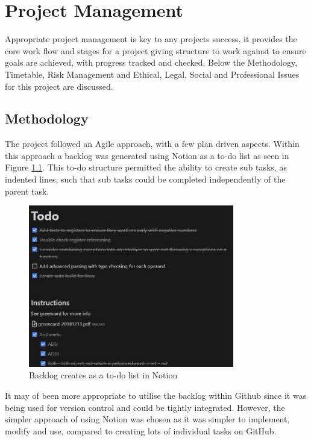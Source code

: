 \chapter{Project Management}
\label{ch:project_management}

Appropriate project management is key to any projects success, it provides the core work flow and stages for a project giving structure to work against to ensure goals are achieved, with progress tracked and checked. Below the Methodology, Timetable, Risk Management and Ethical, Legal, Social and Professional Issues for this project are discussed.

\section{Methodology}
The project followed an Agile \cite{atlassian_2022_what} approach, with a few plan driven aspects. Within this approach a backlog was generated using Notion \cite{notionlabs_2023_your} as a to-do list as seen in Figure \ref{fig:notion}. This to-do structure permitted the ability to create sub tasks, as indented lines, such that sub tasks could be completed independently of the parent task.

\begin{figure}
    \centering
    \includegraphics[width=0.8\textwidth]{dissertation/DATA/notion-todo.jpg}
    \caption{Backlog creates as a to-do list in Notion}
    \label{fig:notion}
\end{figure}

It may of been more appropriate to utilise the backlog within Github since it was being used for version control and could be tightly integrated. However, the simpler approach of using Notion was chosen as it was simpler to implement, modify and use, compared to creating lots of individual tasks on GitHub.

